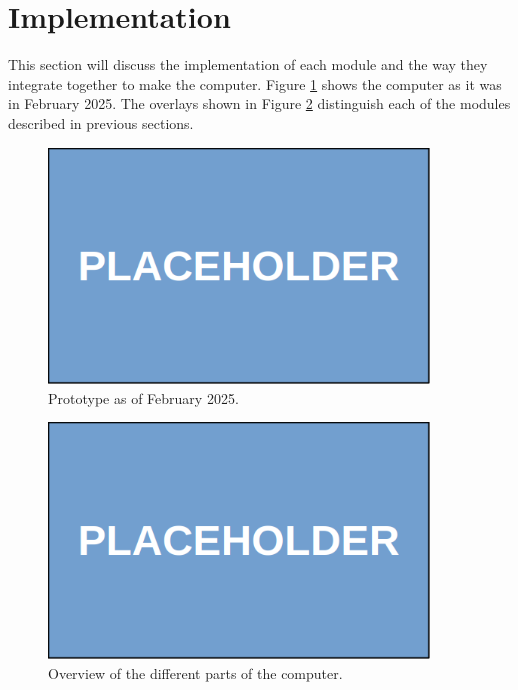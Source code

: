 \section{Implementation} \label{sec:implementation}
This section will discuss the implementation of each module and the way they integrate together to make the computer. Figure \ref{fig:computer} shows the computer as it was in February 2025. The overlays shown in Figure \ref{fig:computer_parts} distinguish each of the modules described in previous sections.

\begin{figure}[H]
  \centering
  \includegraphics[width=0.9\textwidth]{img/placeholder}
  \caption{Prototype as of February 2025.}
  \label{fig:computer}
\end{figure}

\begin{figure}[H]
  \centering
  \includegraphics[width=0.9\textwidth]{img/placeholder}
  \caption{Overview of the different parts of the computer.}
  \label{fig:computer_parts}
\end{figure}


